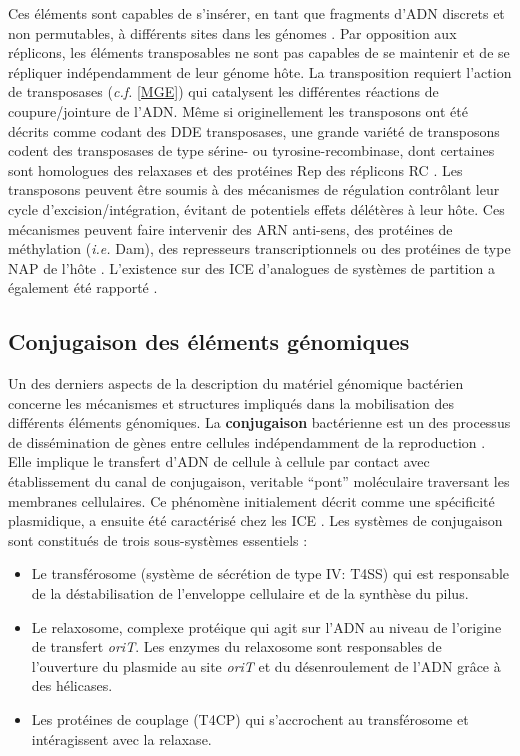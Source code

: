  
	Ces éléments sont capables de s'insérer, en tant que fragments d'ADN discrets et non permutables, à différents sites dans les génomes \citep{higgins2005bacterial}. Par opposition aux réplicons, les éléments transposables ne sont pas capables de se maintenir et de se répliquer indépendamment de leur génome hôte. La transposition requiert l'action de transposases (\textit{c.f.} \ref{MGE}) qui catalysent les différentes réactions de coupure/jointure de l'ADN. Même si originellement les transposons ont été décrits comme codant des DDE transposases, une grande variété de transposons codent des transposases de type sérine- ou tyrosine-recombinase, dont certaines sont homologues des relaxases et des protéines Rep des réplicons RC \citep{Roberts2008}. Les transposons peuvent être soumis à des mécanismes de régulation contrôlant leur cycle d'excision/intégration, évitant de potentiels effets délétères à leur hôte. Ces mécanismes peuvent faire intervenir des ARN anti-sens, des protéines de méthylation (\textit{i.e.} Dam), des represseurs transcriptionnels ou des protéines de type NAP de l'hôte \citep{cornet2004non}. L'existence sur des ICE d'analogues de systèmes de partition a également été rapporté \citep{Wozniak2010}. 

 
 \subsection{Conjugaison des éléments génomiques} \label{conj}
	Un des derniers aspects de la description du matériel génomique bactérien concerne les mécanismes et structures impliqués dans la mobilisation des différents éléments génomiques. La \textbf{conjugaison} bactérienne est un des processus de dissémination de gènes entre cellules indépendamment de la reproduction \citep{lawley2004bacterial}. Elle implique le transfert d'ADN de cellule à cellule par contact avec établissement du canal de conjugaison, veritable “pont” moléculaire traversant les membranes cellulaires. Ce phénomène initialement décrit comme une spécificité plasmidique, a ensuite été caractérisé chez les ICE \citep{Wozniak2010}. Les systèmes de conjugaison sont constitués de trois sous-systèmes essentiels \citep{lawley2004bacterial,Smillie2010}:
\begin{itemize}
	\item Le transférosome (système de sécrétion de type IV: T4SS) qui est responsable de la déstabilisation de l'enveloppe cellulaire et de la synthèse du pilus.
	\item Le relaxosome, complexe protéique qui agit sur l'ADN au niveau de l'origine de transfert \textit{oriT}. Les enzymes du relaxosome sont responsables de l'ouverture du plasmide au site \textit{oriT} et du désenroulement de l'ADN grâce à des hélicases.
	\item Les protéines de couplage (T4CP) qui s'accrochent au transférosome et intéragissent avec la relaxase.
 \end{itemize}

